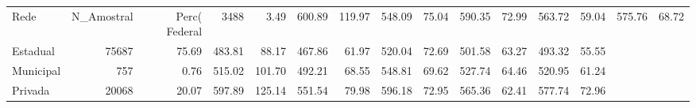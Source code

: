 \begin{tabular}{lrrrrrrrrrrrr}
\toprule
Rede & N_Amostral & Perc(%
\midrule
Federal & 3488 & 3.49 & 600.89 & 119.97 & 548.09 & 75.04 & 590.35 & 72.99 & 563.72 & 59.04 & 575.76 & 68.72 \\
Estadual & 75687 & 75.69 & 483.81 & 88.17 & 467.86 & 61.97 & 520.04 & 72.69 & 501.58 & 63.27 & 493.32 & 55.55 \\
Municipal & 757 & 0.76 & 515.02 & 101.70 & 492.21 & 68.55 & 548.81 & 69.62 & 527.74 & 64.46 & 520.95 & 61.24 \\
Privada & 20068 & 20.07 & 597.89 & 125.14 & 551.54 & 79.98 & 596.18 & 72.95 & 565.36 & 62.41 & 577.74 & 72.96 \\
\bottomrule
\end{tabular}
